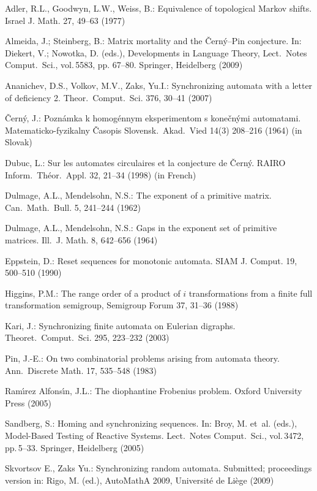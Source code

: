 \documentclass[11pt]{llncs}
\begin{document}
\begin{thebibliography}{99}
Adler, R.L., Goodwyn, L.W., Weiss, B.: Equivalence of topological Markov shifts.
Israel J. Math. 27, 49--63 (1977)

Almeida, J.; Steinberg, B.: Matrix mortality and the \v{C}ern\'{y}--Pin
conjecture. In:  Diekert, V.; Nowotka, D. (eds.), Developments in
Language Theory, Lect.\ Notes Comput.\ Sci., vol.\,5583, pp. 67--80.
Springer, Heidelberg (2009)

Ananichev, D.S., Volkov, M.V., Zaks, Yu.I.: Synchronizing automata
with a letter of deficiency 2. Theor.\ Comput.\ Sci. 376, 30--41 (2007)

\v{C}ern\'{y}, J.: Pozn\'{a}mka k homog\'{e}nnym eksperimentom s
kone\v{c}n\'{y}mi automatami. Matematicko-fyzikalny \v{C}asopis
Slovensk.\ Akad.\ Vied 14(3) 208--216 (1964) (in Slovak)

Dubuc, L.: Sur les automates circulaires et la conjecture de
\v{C}ern\'y. RAIRO Inform.\ Th\'eor.\ Appl. 32, 21--34 (1998) (in
French)

Dulmage, A.L., Mendelsohn, N.S.: The exponent of a primitive matrix.
Can.\ Math.\ Bull. 5, 241--244 (1962)

Dulmage, A.L., Mendelsohn, N.S.: Gaps in the exponent set of primitive
matrices. Ill.\ J. Math. 8, 642--656 (1964)

Eppstein, D.: Reset sequences for monotonic automata. SIAM J.
Comput. 19, 500--510 (1990)

Higgins, P.M.: The range order of a product of $i$ transformations
from a finite full transformation semigroup, Semigroup Forum 37, 31--36
(1988)

Kari, J.: Synchronizing finite automata on Eulerian digraphs.
Theoret.\ Comput.\ Sci. 295, 223--232 (2003)

Pin, J.-E.: On two combinatorial problems arising from automata
theory. Ann.\ Discrete Math. 17, 535--548 (1983)

Ram\'{\i}rez Alfons\'{\i}n, J.L.: The diophantine Frobenius problem.
Oxford University Press (2005)

Sandberg, S.: Homing and synchronizing sequences. In: Broy, M.
et~al. (eds.), Model-Based Testing of Reactive Systems. Lect.\
Notes Comput.\ Sci., vol.\,3472, pp.\,5--33. Springer, Heidelberg
(2005)

Skvortsov E., Zaks Yu.: Synchronizing random automata. Submitted;
proceedings version in: Rigo, M. (ed.), AutoMathA 2009, Universit\'e
de Li\`ege (2009)


\end{thebibliography}
\end{document}
